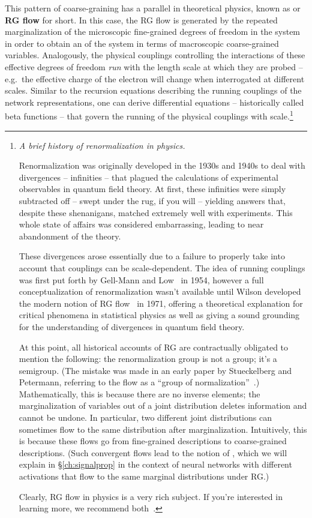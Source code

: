 This pattern of coarse-graining has a parallel in theoretical physics, known as  or \textbf{RG flow} for short. In this case, the RG flow is generated by the repeated marginalization of the microscopic fine-grained degrees of freedom in the system in order to obtain an  of the system in terms of macroscopic coarse-grained variables. Analogously, the physical couplings controlling the interactions of these effective degrees of freedom \emph{run} with the length scale at which they are probed -- e.g.~the effective charge of the electron will change when interrogated at different scales. Similar to the recursion equations describing the running couplings of the network representations, one can derive differential equations -- historically called beta functions -- that govern the running of the physical couplings with scale.\footnote{\emph{A brief history of renormalization in physics.}

Renormalization was originally developed in the 1930s and 1940s to deal with divergences -- infinities -- that plagued the calculations of experimental observables in quantum field theory. At first, these infinities were simply subtracted off -- swept under the rug, if you will -- yielding answers that, despite these shenanigans, matched extremely well with experiments. This whole state of affairs was considered embarrassing, leading to near abandonment of the theory. 

These divergences arose essentially due to a failure to properly take into account 
that couplings can be scale-dependent. The idea of running couplings was first put forth by Gell-Mann and Low~\cite{gellmanlow} in 1954,
however a full conceptualization of renormalization
wasn't available until Wilson developed the modern notion of RG flow~\cite{PhysRevB.4.3174,PhysRevB.4.3184} in 1971, offering a theoretical explanation for critical phenomena in statistical physics as well as giving a
sound grounding for the understanding of
divergences in quantum field theory.

At this point, all historical accounts of RG are contractually obligated to mention the following: the renormalization group is not a group; it's a semigroup. (The mistake was made in an early paper by Stueckelberg and Petermann, referring to the flow as a ``group of normalization''~\cite{Petermann:1953wpa}.)  Mathematically, this is because there are no
inverse elements; the marginalization of variables out of a joint distribution deletes information and cannot be undone. In particular, two different joint distributions can sometimes flow to the same distribution after marginalization. Intuitively, this is because these flows go from fine-grained descriptions to coarse-grained descriptions. (Such convergent flows lead to the notion of , which we will explain in \S\ref{ch:signalprop} in the context of neural networks with different activations that flow to the same marginal distributions under RG.)

Clearly, RG flow in physics is a very rich subject. If you're interested in learning more, we recommend both~\cite{goldenfeld2018lectures,cardy_1996}.%
}
